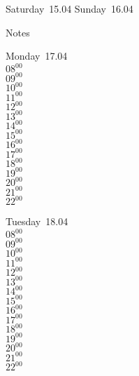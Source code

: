 \documentclass[11pt,a4paper]{book}\usepackage[]{graphicx}\usepackage[]{color}
\begin{document}
\begin{weekendbox}
  Saturday~15.04
  \tcblower
  Sunday~16.04
\end{weekendbox} %
\begin{notebox}
  Notes
\end{notebox}
\clearpage
\begin{headerbox}
\end{headerbox}
\begin{weekdaybox}
  Monday~17.04\\
  { 
  \vfill
  $08^{00}$\\
$09^{00}$\\
$10^{00}$\\
$11^{00}$\\
$12^{00}$\\
$13^{00}$\\
$14^{00}$\\
$15^{00}$\\
$16^{00}$\\
$17^{00}$\\
$18^{00}$\\
$19^{00}$\\
$20^{00}$\\
$21^{00}$\\
$22^{00}$\\
  }
\end{weekdaybox}
\begin{weekdaybox}
  Tuesday~18.04\\
  { 
  \vfill
  $08^{00}$\\
$09^{00}$\\
$10^{00}$\\
$11^{00}$\\
$12^{00}$\\
$13^{00}$\\
$14^{00}$\\
$15^{00}$\\
$16^{00}$\\
$17^{00}$\\
$18^{00}$\\
$19^{00}$\\
$20^{00}$\\
$21^{00}$\\
$22^{00}$\\
  }
\end{weekdaybox}
\end{document}
